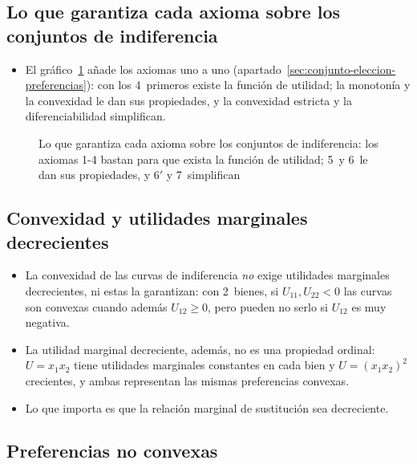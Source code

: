 \documentclass[11pt]{article}
\begin{document}
\subsection{Lo que garantiza cada axioma sobre los conjuntos de indiferencia}\label{anexo:axiomas-grafico}

\begin{itemize}
\item El gráfico~\ref{fig:axiomas-curva-indiferencia} añade los axiomas uno a uno (apartado~\ref{sec:conjunto-eleccion-preferencias}): con los 4~primeros existe la función de utilidad; la monotonía y la convexidad le dan sus propiedades, y la convexidad estricta y la diferenciabilidad simplifican.
\end{itemize}

\begin{figure}[H]
\centering
\caption{Lo que garantiza cada axioma sobre los conjuntos de indiferencia: los axiomas 1-4 bastan para que exista la función de utilidad; 5~y 6~le dan sus propiedades, y 6$'$ y 7~simplifican}\label{fig:axiomas-curva-indiferencia}
\end{figure}

\subsection{Convexidad y utilidades marginales decrecientes}\label{anexo:convexidad-umg}

\begin{itemize}
\item La convexidad de las curvas de indiferencia \emph{no} exige utilidades marginales decrecientes, ni estas la garantizan: con 2~bienes, si $U_{11},U_{22}<0$ las curvas son convexas cuando además $U_{12}\geq 0$, pero pueden no serlo si $U_{12}$ es muy negativa.
\item La utilidad marginal decreciente, además, no es una propiedad ordinal: $U=x_1x_2$ tiene utilidades marginales constantes en cada bien y $U=(x_1x_2)^2$ crecientes, y ambas representan las mismas preferencias convexas.
\item Lo que importa es que la relación marginal de sustitución sea decreciente.
\end{itemize}

\subsection{Preferencias no convexas}\label{anexo:no-convexas}
\end{document}
